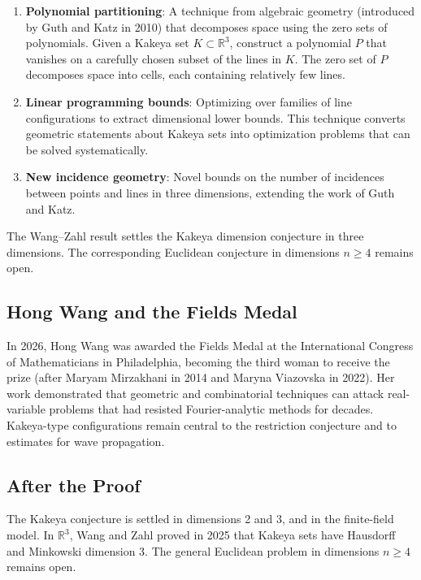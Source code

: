 \begin{enumerate}
\item \textbf{Polynomial partitioning}: A technique from algebraic geometry (introduced by Guth and Katz in 2010) that decomposes space using the zero sets of polynomials. Given a Kakeya set $K \subset \mathbb{R}^3$, construct a polynomial $P$ that vanishes on a carefully chosen subset of the lines in $K$. The zero set of $P$ decomposes space into cells, each containing relatively few lines.
\item \textbf{Linear programming bounds}: Optimizing over families of line configurations to extract dimensional lower bounds. This technique converts geometric statements about Kakeya sets into optimization problems that can be solved systematically.
\item \textbf{New incidence geometry}: Novel bounds on the number of incidences between points and lines in three dimensions, extending the work of Guth and Katz.
\end{enumerate}

\begin{highlightbox}
The Wang--Zahl result settles the Kakeya dimension conjecture in three dimensions. The corresponding Euclidean conjecture in dimensions $n\geq4$ remains open.
\end{highlightbox}

\subsection{Hong Wang and the Fields Medal}

In 2026, Hong Wang was awarded the Fields Medal at the International Congress of Mathematicians in Philadelphia, becoming the third woman to receive the prize (after Maryam Mirzakhani in 2014 and Maryna Viazovska in 2022). Her work demonstrated that geometric and combinatorial techniques can attack real-variable problems that had resisted Fourier-analytic methods for decades. Kakeya-type configurations remain central to the restriction conjecture and to estimates for wave propagation.

\subsection{After the Proof}

The Kakeya conjecture is settled in dimensions 2 and 3, and in the finite-field model. In $\mathbb{R}^3$, Wang and Zahl proved in 2025 that Kakeya sets have Hausdorff and Minkowski dimension 3. The general Euclidean problem in dimensions $n\geq4$ remains open.

